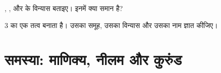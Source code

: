 \begin{exercise}[$\star\star\star$]\label{exo:g10:electron-shells:14}
, ,  और
 के विन्यास बताइए। इनमें क्या समान है?
\end{exercise}

\begin{exercise}[$\star\star\star$]\label{exo:g10:electron-shells:15}
 3 का एक तत्व   बनाता है। उसका समूह, उसका
विन्यास और उसका नाम ज्ञात कीजिए।
\end{exercise}

\section{समस्या: माणिक्य, नीलम और कुरुंड}


